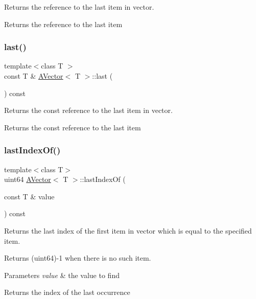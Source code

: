 Returns the reference to the last item in vector. 

\begin{DoxyReturn}{Returns}
the reference to the last item 
\end{DoxyReturn}
\mbox{\label{class_a_vector_afbdc200be19695bebbbc54dce5693f98}} 
\subsubsection{\texorpdfstring{last()}{last()}\hspace{0.1cm}{\footnotesize\ttfamily [2/2]}}
{\footnotesize\ttfamily template$<$class T $>$ \\
const T \& \mbox{\hyperlink{class_a_vector}{A\+Vector}}$<$ T $>$\+::last (\begin{DoxyParamCaption}{ }\end{DoxyParamCaption}) const}



Returns the const reference to the last item in vector. 

\begin{DoxyReturn}{Returns}
the const reference to the last item 
\end{DoxyReturn}
\mbox{\label{class_a_vector_adcb1b4189e7e270ab8a22fa29ce109ae}} 
\subsubsection{\texorpdfstring{lastIndexOf()}{lastIndexOf()}}
{\footnotesize\ttfamily template$<$class T$>$ \\
uint64 \mbox{\hyperlink{class_a_vector}{A\+Vector}}$<$ T $>$\+::last\+Index\+Of (\begin{DoxyParamCaption}\item[{const T \&}]{value }\end{DoxyParamCaption}) const}



Returns the last index of the first item in vector which is equal to the specified item. 

Returns (uint64)-\/1 when there is no such item.


\begin{DoxyParams}{Parameters}
{\em value} & the value to find \\
\hline
\end{DoxyParams}
\begin{DoxyReturn}{Returns}
the index of the last occurrence 
\end{DoxyReturn}
\mbox{\label{class_a_vector_ac0fd7bd21468b282eb563badd30f73f6}} 
